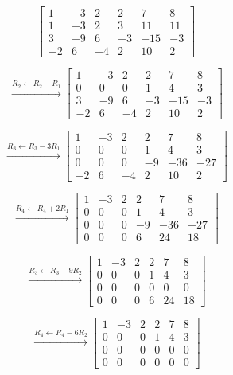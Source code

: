 \begin{answer}
    $$
    \left[
    \begin{array}{ccccc|c}
    1&-3&2&2&7&8\\
    1&-3&2&3&11&11\\
    3&-9&6&-3&-15&-3\\
    -2&6&-4&2&10&2
    \end{array}
    \right]
    $$

    $$
    \xrightarrow{R_2\leftarrow R_2-R_1}
    \left[
    \begin{array}{ccccc|c}
    1&-3&2&2&7&8\\
    0&0&0&1&4&3\\
    3&-9&6&-3&-15&-3\\
    -2&6&-4&2&10&2
    \end{array}
    \right]
    $$

    $$
    \xrightarrow{R_3\leftarrow R_3-3R_1}
    \left[
    \begin{array}{ccccc|c}
    1&-3&2&2&7&8\\
    0&0&0&1&4&3\\
    0&0&0&-9&-36&-27\\
    -2&6&-4&2&10&2
    \end{array}
    \right]
    $$

    $$
    \xrightarrow{R_4\leftarrow R_4+2R_1}
    \left[
    \begin{array}{ccccc|c}
    1&-3&2&2&7&8\\
    0&0&0&1&4&3\\
    0&0&0&-9&-36&-27\\
    0&0&0&6&24&18
    \end{array}
    \right]
    $$

    $$
    \xrightarrow{R_3\leftarrow R_3+9R_2}
    \left[
    \begin{array}{ccccc|c}
    1&-3&2&2&7&8\\
    0&0&0&1&4&3\\
    0&0&0&0&0&0\\
    0&0&0&6&24&18
    \end{array}
    \right]
    $$

    $$
    \xrightarrow{R_4\leftarrow R_4-6R_2}
    \left[
    \begin{array}{ccccc|c}
    1&-3&2&2&7&8\\
    0&0&0&1&4&3\\
    0&0&0&0&0&0\\
    0&0&0&0&0&0
    \end{array}
    \right]
    $$


\end{answer}
